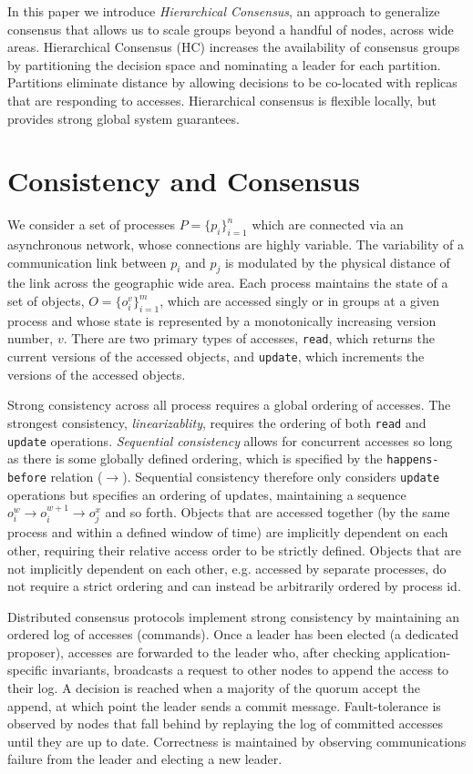 \documentclass[11pt,letterpaper]{article}
\begin{document}
In this paper we introduce \textit{Hierarchical Consensus}, an approach to generalize
consensus that allows us to scale groups beyond a handful of nodes, across wide areas.
Hierarchical Consensus (HC) increases the availability of consensus groups by
partitioning the decision space and nominating a leader for each partition.
Partitions eliminate distance by allowing decisions to be co-located with replicas that
are responding to accesses. Hierarchical consensus is flexible locally, but provides
strong global system guarantees.

\section{Consistency and Consensus}

We consider a set of processes $P = \{p_i\}_{i=1}^n$ which are connected via an asynchronous network, whose connections are highly variable.
The variability of a communication link between $p_i$ and $p_j$ is modulated by the
physical distance of the link across the geographic wide area.
Each process maintains the state of a set of objects, $O = \{o_i^v\}_{i=1}^m$, which are
accessed singly or in groups at a given process and whose state is represented by a monotonically increasing version number, $v$. There are two primary types of accesses, \texttt{read}, which returns the current versions of the accessed objects, and \texttt{update}, which increments the versions of the accessed objects.

Strong consistency across all process requires a global ordering of accesses. The strongest consistency, \textit{linearizablity}, requires the ordering of both \texttt{read} and \texttt{update} operations. \textit{Sequential consistency} allows for concurrent accesses so long as there is some globally defined ordering, which is specified by the \texttt{happens-before} relation ($\rightarrow$). Sequential consistency therefore only considers \texttt{update} operations but specifies an ordering of updates, maintaining a sequence $o_i^w \rightarrow o_i^{w+1} \rightarrow o_j^x$ and so forth. Objects that are accessed together (by the same process and within a defined window of time) are implicitly dependent on each other, requiring their relative access order to be strictly defined. Objects that are not implicitly dependent on each other, e.g. accessed by separate processes, do not require a strict ordering and can instead be arbitrarily ordered by process id.

Distributed consensus protocols implement strong consistency by maintaining an ordered log of accesses (commands). Once a leader has been elected (a dedicated proposer), accesses are forwarded to the leader who, after checking application-specific invariants, broadcasts a request to other nodes to append the access to their log. A decision is reached when a majority of the quorum accept the append, at which point the leader sends a commit message. Fault-tolerance is observed by nodes that fall behind by replaying the log of committed accesses until they are up to date. Correctness is maintained by observing communications failure from the leader and electing a new leader.
\end{document}
